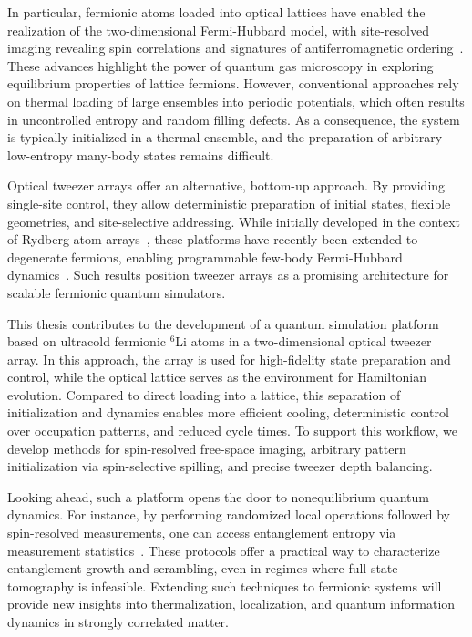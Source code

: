 In particular, fermionic atoms loaded into optical lattices have enabled the realization of the two-dimensional Fermi-Hubbard model, with site-resolved imaging revealing spin correlations and signatures of antiferromagnetic ordering~\cite{parsons_site-resolved_2016, boll_spin-_2016}. These advances highlight the power of quantum gas microscopy in exploring equilibrium properties of lattice fermions. However, conventional approaches rely on thermal loading of large ensembles into periodic potentials, which often results in uncontrolled entropy and random filling defects. As a consequence, the system is typically initialized in a thermal ensemble, and the preparation of arbitrary low-entropy many-body states remains difficult.

Optical tweezer arrays offer an alternative, bottom-up approach. By providing single-site control, they allow deterministic preparation of initial states, flexible geometries, and site-selective addressing. While initially developed in the context of Rydberg atom arrays~\cite{browaeys_many-body_2020}, these platforms have recently been extended to degenerate fermions, enabling programmable few-body Fermi-Hubbard dynamics~\cite{spar_realization_2022, yan_two-dimensional_2022}. Such results position tweezer arrays as a promising architecture for scalable fermionic quantum simulators.

This thesis contributes to the development of a quantum simulation platform based on ultracold fermionic $^6$Li atoms in a two-dimensional optical tweezer array. In this approach, the array is used for high-fidelity state preparation and control, while the optical lattice serves as the environment for Hamiltonian evolution. Compared to direct loading into a lattice, this separation of initialization and dynamics enables more efficient cooling, deterministic control over occupation patterns, and reduced cycle times. To support this workflow, we develop methods for spin-resolved free-space imaging, arbitrary pattern initialization via spin-selective spilling, and precise tweezer depth balancing.

Looking ahead, such a platform opens the door to nonequilibrium quantum dynamics. For instance, by performing randomized local operations followed by spin-resolved measurements, one can access entanglement entropy via measurement statistics~\cite{brydges_probing_2019}. These protocols offer a practical way to characterize entanglement growth and scrambling, even in regimes where full state tomography is infeasible. Extending such techniques to fermionic systems will provide new insights into thermalization, localization, and quantum information dynamics in strongly correlated matter.


